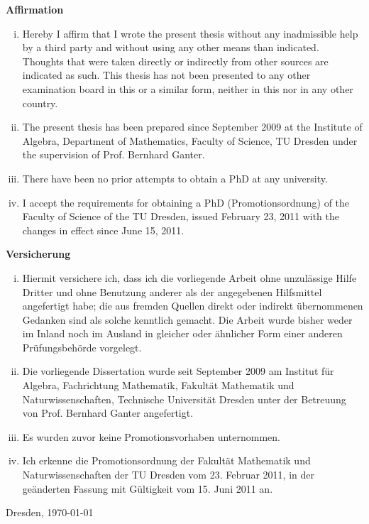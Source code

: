 \cleardoublepage
\thispagestyle{empty}

\begin{flushright}
  \LARGE\bfseries Affirmation
\end{flushright}
\medskip

\begin{enumerate}[i. ]
\item Hereby I affirm that I wrote the present thesis without any inadmissible help by a
  third party and without using any other means than indicated. Thoughts that were taken
  directly or indirectly from other sources are indicated as such. This thesis has not
  been presented to any other examination board in this or a similar form, neither in this
  nor in any other country.

\item The present thesis has been prepared since September 2009 at the Institute of
  Algebra, Department of Mathematics, Faculty of Science, TU Dresden under the supervision
  of Prof. Bernhard Ganter.

\item There have been no prior attempts to obtain a PhD at any university.

\item I accept the requirements for obtaining a PhD (Promotionsordnung) of the Faculty of
  Science of the TU Dresden, issued February 23, 2011 with the changes in effect since June
  15, 2011.
\end{enumerate}


\begin{flushright}
  \LARGE\bfseries Versicherung
\end{flushright}
\medskip

\begin{enumerate}[i. ]
\item Hiermit versichere ich, dass ich die vorliegende Arbeit ohne unzulässige Hilfe
  Dritter und ohne Benutzung anderer als der angegebenen Hilfsmittel angefertigt habe; die
  aus fremden Quellen direkt oder indirekt übernommenen Gedanken sind als solche kenntlich
  gemacht. Die Arbeit wurde bisher weder im Inland noch im Ausland in gleicher oder
  ähnlicher Form einer anderen Prüfungsbehörde vorgelegt.

\item Die vorliegende Dissertation wurde seit September 2009 am Institut für Algebra,
  Fachrichtung Mathematik, Fakultät Mathematik und Naturwissenschaften, Technische
  Universität Dresden unter der Betreuung von Prof. Bernhard Ganter angefertigt.

\item Es wurden zuvor keine Promotionsvorhaben unternommen.

\item Ich erkenne die Promotionsordnung der Fakultät Mathematik und Naturwissenschaften
  der TU Dresden vom 23. Februar 2011, in der geänderten Fassung mit Gültigkeit vom
  15. Juni 2011 an.
\end{enumerate}


\vfill

Dresden, \today

